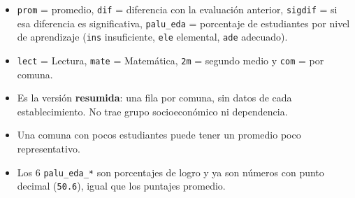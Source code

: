 \documentclass[10.5pt]{article}
\begin{document}
\begin{estrategiabox}
\begin{itemize}[leftmargin=1.1em,itemsep=2pt,topsep=2pt]
\item \texttt{prom} = promedio, \texttt{dif} = diferencia con la evaluación anterior, \texttt{sigdif} = si esa diferencia es significativa, \texttt{palu\_\allowbreak{}eda} = porcentaje de estudiantes por nivel de aprendizaje (\texttt{ins} insuficiente, \texttt{ele} elemental, \texttt{ade} adecuado).
\item \texttt{lect} = Lectura, \texttt{mate} = Matemática, \texttt{2m} = segundo medio y \texttt{com} = por comuna.
\end{itemize}
\end{estrategiabox}

\begin{alertabox}
\begin{itemize}[leftmargin=1.1em,itemsep=2pt,topsep=2pt]
\item Es la versión \textbf{resumida}: una fila por comuna, sin datos de cada establecimiento. No trae grupo socioeconómico ni dependencia.
\item Una comuna con pocos estudiantes puede tener un promedio poco representativo.
\item Los 6 \texttt{palu\_\allowbreak{}eda\_\allowbreak{}*} son porcentajes de logro y ya son números con punto decimal (\texttt{50.6}), igual que los puntajes promedio.
\end{itemize}
\end{alertabox}

\newpage
{}\label{base5}\hypertarget{base5}{}
\end{document}
